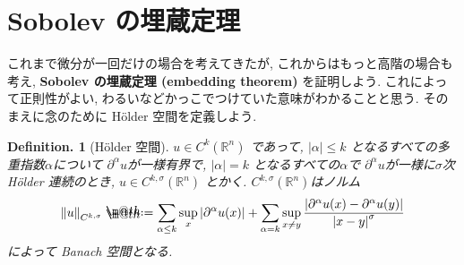 \documentclass[openany, a4paper, oneside]{jsbook}
\makeatletter
\newcommand*{\defeq}{\mathrel{\rlap{%
\raisebox{0.3ex}{$\m@th\cdot$}}%
\raisebox{-0.3ex}{$\m@th\cdot$}}%
=}
\theoremstyle{break}
\theoremstyle{breakdefn}
\newtheorem{defn}[thm]{Definition.}
\newcommand{\abs}[1]{\left|#1\right|}
\newcommand{\norm}[1]{\left\Vert#1\right\Vert}
\newcommand{\bbR}{\mathbb{R}}
\makeatother
\begin{document}
\section{Sobolev の埋蔵定理}


これまで微分が一回だけの場合を考えてきたが, これからはもっと高階の場合も考え,
\textbf{Sobolev の埋蔵定理 (embedding theorem)} を証明しよう.
これによって正則性がよい, わるいなどかっこでつけていた意味がわかることと思う.
そのまえに念のために H\"older 空間を定義しよう.
\begin{defn}[H\"{o}lder 空間]
 $u \in C^k (\bbR^n)$ であって, $\abs{\alpha} \le k$ となるすべての多重指数$\alpha$について
 $\partial^{\alpha} u$が一様有界で, $|\alpha| = k$ となるすべての$\alpha$で
 $\partial^{\alpha} u$が一様に$\sigma$次 H\"older 連続のとき,
 $u \in C^{k, \sigma}(\bbR^n)$ とかく.
 $C^{k, \sigma}(\bbR^n)$はノルム
 \begin{align}
  \norm{u}_{C^{k, \sigma}}
  \defeq
  \sum_{\alpha \le k}\sup_{x} \abs{\partial^{\alpha}u (x)} +
   \sum_{\alpha = k}\sup_{x \neq y}
    \frac{\abs{\partial^{\alpha}u (x) - \partial^{\alpha}u (y)}}{\abs{x - y}^{\sigma}}
 \end{align}
 によって Banach 空間となる.
\end{defn}
\end{document}
